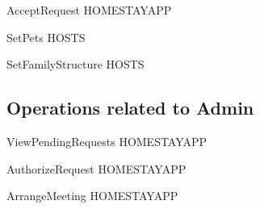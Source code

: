 \documentclass[11pt]{article}
\begin{document}
\begin{schema}{AcceptRequest}
	\Delta HOMESTAYAPP\\
\end{schema}

\begin{schema}{SetPets}
	\Delta HOSTS\\
\end{schema}

\begin{schema}{SetFamilyStructure}
	\Delta HOSTS\\
\end{schema}


\subsection*{Operations related to Admin}

\begin{schema}{ViewPendingRequests}
	\Xi HOMESTAYAPP\\
\end{schema}

\begin{schema}{AuthorizeRequest}
	\Delta HOMESTAYAPP\\
\end{schema}

\begin{schema}{ArrangeMeeting}
	\Delta HOMESTAYAPP\\
\end{schema}
\end{document}
